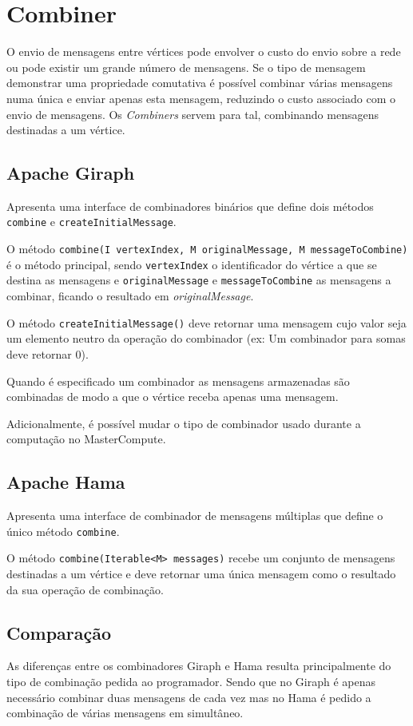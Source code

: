 \newpage
\section{Combiner}
O envio de mensagens entre vértices pode envolver o custo do envio sobre a rede ou pode existir um grande número de mensagens. Se o tipo de mensagem demonstrar uma propriedade comutativa é possível combinar várias mensagens numa única e enviar apenas esta mensagem, reduzindo o custo associado com o envio de mensagens. Os \textit{Combiners} servem para tal, combinando mensagens destinadas a um vértice.

\subsection*{Apache Giraph}
Apresenta uma interface de combinadores binários que define dois métodos \texttt{combine} e \texttt{createInitialMessage}.

O método \texttt{combine(I vertexIndex, M originalMessage, M messageToCombine)} é o método principal, sendo \texttt{vertexIndex} o identificador do vértice a que se destina as mensagens e \texttt{originalMessage} e \texttt{messageToCombine} as mensagens a combinar, ficando o resultado em \textsl{originalMessage}.

O método \texttt{createInitialMessage()} deve retornar uma mensagem cujo valor seja um elemento neutro da operação do combinador (ex: Um combinador para somas deve retornar 0).

Quando é especificado um combinador as mensagens armazenadas são combinadas de modo a que o vértice receba apenas uma mensagem.

Adicionalmente, é possível mudar o tipo de combinador usado durante a computação no MasterCompute.
\subsection*{Apache Hama}
Apresenta uma interface de combinador de mensagens múltiplas que define o único método \texttt{combine}.

O método \texttt{combine(Iterable<M> messages)} recebe um conjunto de mensagens destinadas a um vértice e deve retornar uma única mensagem como o resultado da sua operação de combinação.


\subsection*{Comparação}
As diferenças entre os combinadores Giraph e Hama resulta principalmente do tipo de combinação pedida ao programador. Sendo que no Giraph é apenas necessário combinar duas mensagens de cada vez mas no Hama é pedido a combinação de várias mensagens em simultâneo.

